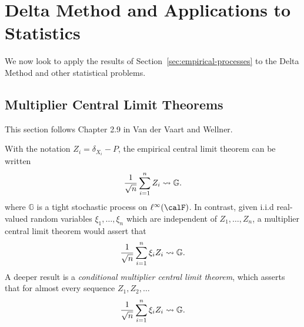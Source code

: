 
\section{Delta Method and Applications to Statistics}
\label{sec:delta-applications}

We now look to apply the results of Section~\ref{sec:empirical-processes} to the Delta Method and other statistical problems. 

\subsection{Multiplier Central Limit Theorems}%
\label{subsec:mclt}

This section follows Chapter 2.9 in Van der Vaart and Wellner. 

With the notation \(Z_i = \delta_{X_i}-P\), the empirical central limit theorem can be written
\[
    \frac{1}{\sqrt{n}} \sum_{i=1}^n Z_i \rightsquigarrow \mathbb{G}
.\] 
where \(\mathbb{G}\) is a tight stochastic process on \(\ell^\infty(\calF)\). In contrast, given i.i.d real-valued random variables \(\xi_1,\dots,\xi_n\) which are independent of \(Z_1,\dots,Z_n\), a multiplier central limit theorem would assert that 
\[
    \frac{1}{\sqrt{n}}\sum_{i=1}^n \xi_iZ_i\rightsquigarrow \mathbb{G}
.\]
A deeper result is a \emph{conditional multiplier central limit theorem}, which asserts that for almost every sequence \(Z_1,Z_2,\dots\) 
\[
    \frac{1}{\sqrt{n}}\sum_{i=1}^n \xi_iZ_i\rightsquigarrow \mathbb{G}
.\]

